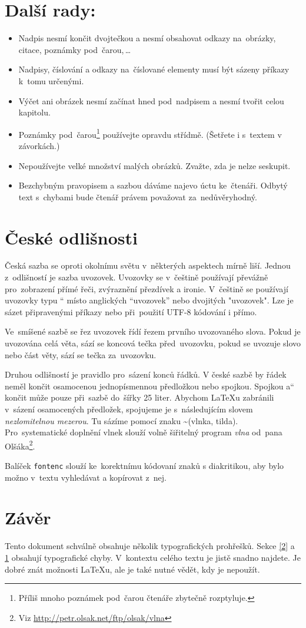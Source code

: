 \documentclass[a4paper,twocolumn]{article}
\newcommand{\myuv}[1]{\quotedblbase #1\textquotedblleft}
\newcommand{\mycode}[1]{\texttt{#1}}
\begin{document}
\section{Další rady:}
\label{3}
\begin{itemize}
\item {Nadpis nesmí končit dvojtečkou a nesmí obsahovat odkazy na~obrázky, citace, poznámky pod~čarou,\,\dots}
\item {Nadpisy, číslování a odkazy na~číslované elementy musí být sázeny příkazy k~tomu určenými.}
\item {Výčet ani obrázek nesmí začínat hned pod~nadpisem a nesmí tvořit celou kapitolu.} 
\item {Poznámky pod~čarou\footnote{Příliš mnoho poznámek pod~čarou čtenáře zbytečně rozptyluje.} používejte opravdu střídmě. (Šetřete i s~textem v závorkách.)}
\item {Nepoužívejte velké množství malých obrázků. Zvažte, zda je nelze seskupit.}
\item {Bezchybným pravopisem a sazbou dáváme najevo úctu ke~čtenáři. Odbytý text s~chybami bude čtenář právem považovat za~nedůvěryhodný.}
\end{itemize}

\section{České odlišnosti}
Česká sazba se oproti okolnímu světu v~některých aspektech mírně liší. Jednou z~odlišností je sazba uvozovek. Uvozovky se v~češtině používají převážně pro~zobrazení přímé řeči, zvýraznění přezdívek a ironie. V~češtině se používají uvozovky typu \myuv{9966} místo anglických ``uvozovek'' nebo dvojitých "uvozovek". Lze je sázet připravenými příkazy nebo při~použití UTF-8 kódování i přímo.

Ve~smíšené sazbě se řez uvozovek řídí řezem prvního uvozovaného slova. Pokud je uvozována celá věta, sází se koncová tečka před~uvozovku, pokud se uvozuje slovo nebo část věty, sází se tečka za~uvozovku.

Druhou odlišností je pravidlo pro~sázení konců řádků. V české sazbě by řádek neměl končit osamocenou jednopísmennou předložkou nebo spojkou. Spojkou \myuv{a} končit může pouze při~sazbě do~šířky 25 liter. Abychom \LaTeX{u} zabránili v~sázení osamocených předložek, spojujeme je s~následujícím slovem \emph{nezlomitelnou mezerou}. Tu sázíme pomocí znaku \textasciitilde (vlnka, tilda). Pro~systematické doplnění vlnek slouží volně šiřitelný program \emph{vlna} od~pana Olšáka\footnote{Viz \url{http://petr.olsak.net/ftp/olsak/vlna}}.\par

Balíček \mycode{fontenc} slouží ke~korektnímu kódovaní znaků s diakritikou, aby bylo možno v~textu vyhledávat a kopírovat z~nej.

\section{Závěr}
Tento dokument schválně obsahuje několik typografických prohřešků. Sekce \ref{2} a \ref{3} obsahují typografické chyby. V~kontextu celého textu je jistě snadno najdete. Je dobré znát možnosti \LaTeX{u}, ale je také nutné vědět, kdy je nepoužít.
\end{document}
